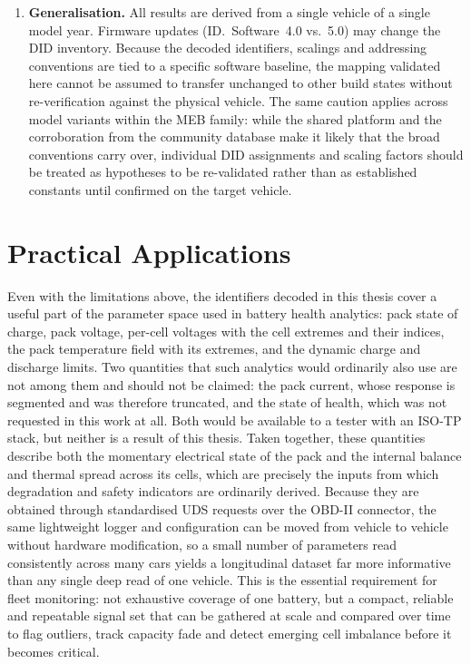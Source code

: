 \documentclass[11pt,a4paper,oneside,parskip=half]{scrreprt}
\begin{document}
\begin{enumerate}
  \item \textbf{Generalisation.} All results are derived from a single vehicle of a single model year. Firmware updates (ID.~Software~4.0 vs.\ 5.0) may change the DID inventory. Because the decoded identifiers, scalings and addressing conventions are tied to a specific software baseline, the mapping validated here cannot be assumed to transfer unchanged to other build states without re-verification against the physical vehicle. The same caution applies across model variants within the MEB family: while the shared platform and the corroboration from the community database make it likely that the broad conventions carry over, individual DID assignments and scaling factors should be treated as hypotheses to be re-validated rather than as established constants until confirmed on the target vehicle.
\end{enumerate}

\section{Practical Applications}
Even with the limitations above, the identifiers decoded in this thesis cover a useful part of the parameter space used in battery health analytics: pack state of charge, pack voltage, per-cell voltages with the cell extremes and their indices, the pack temperature field with its extremes, and the dynamic charge and discharge limits. Two quantities that such analytics would ordinarily also use are not among them and should not be claimed: the pack current, whose response is segmented and was therefore truncated, and the state of health, which was not requested in this work at all. Both would be available to a tester with an ISO-TP stack, but neither is a result of this thesis. Taken together, these quantities describe both the momentary electrical state of the pack and the internal balance and thermal spread across its cells, which are precisely the inputs from which degradation and safety indicators are ordinarily derived. Because they are obtained through standardised UDS requests over the OBD-II connector, the same lightweight logger and configuration can be moved from vehicle to vehicle without hardware modification, so a small number of parameters read consistently across many cars yields a longitudinal dataset far more informative than any single deep read of one vehicle. This is the essential requirement for fleet monitoring: not exhaustive coverage of one battery, but a compact, reliable and repeatable signal set that can be gathered at scale and compared over time to flag outliers, track capacity fade and detect emerging cell imbalance before it becomes critical.
\end{document}
